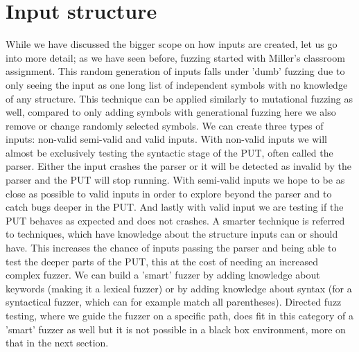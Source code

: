 \section{Input structure}
\label{cha:2:InputStructure}
While we have discussed the bigger scope on how inputs are created, let us go into more detail; as we have seen before, fuzzing started with Miller's classroom assignment. This random generation of inputs falls under 'dumb' fuzzing due to only seeing the input as one long list of independent symbols with no knowledge of any structure. This technique can be applied similarly to mutational fuzzing as well, compared to only adding symbols with generational fuzzing here we also remove or change randomly selected symbols. 
We can create three types of inputs: non-valid semi-valid and valid inputs. With non-valid inputs we will almost be exclusively testing the syntactic stage of the PUT, often called the parser. Either the input crashes the parser or it will be detected as invalid by the parser and the PUT will stop running. With semi-valid inputs we hope to be as close as possible to valid inputs in order to explore beyond the parser and to catch bugs deeper in the PUT. And lastly with valid input we are testing if the PUT behaves as expected and does not crashes.
A smarter technique is referred to techniques, which have knowledge about the structure inputs can or should have. This increases the chance of inputs passing the parser and being able to test the deeper parts of the PUT, this at the cost of needing an increased complex fuzzer. We can build a 'smart' fuzzer by adding knowledge about keywords (making it a lexical fuzzer) or by adding knowledge about syntax (for a syntactical fuzzer, which can for example match all parentheses). Directed fuzz testing, where we guide the fuzzer on a specific path, does fit in this category of a 'smart' fuzzer as well but it is not possible in a black box environment, more on that in the next section.

